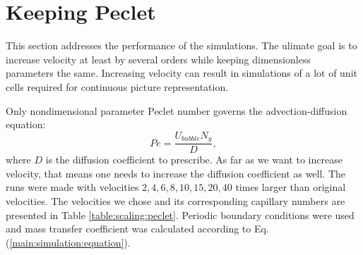 \documentclass{article}
\newcommand{\beq}{\begin{equation}}
\newcommand{\feq}{\end{equation}}
\begin{document}
\section{Keeping Peclet}
This section addresses the performance of the simulations. The ulimate goal is to increase
velocity at least by several orders while keeping dimensionless parameters the same. Increasing
velocity can result in simulations of a lot of unit cells required for continuous picture
representation.

Only nondimensional parameter Peclet number governs the advection-diffusion equation:
\beq
Pe=\frac{U_{bubble} N_y}{D},
\feq
where $D$ is the diffusion coefficient to prescribe. As far as we want to increase velocity, that
means one needs to increase the diffusion coefficient as well. The runs were made with
velocities $2,4,6,8,10,15,20,40$ times larger than original velocities. The velocities we chose and
its corresponding capillary numbers are presented in Table \ref{table:scaling:peclet}. Periodic
boundary conditions were used and mass transfer coefficient was calculated according to Eq.
(\ref{main:simulation:equation}).
\end{document}
